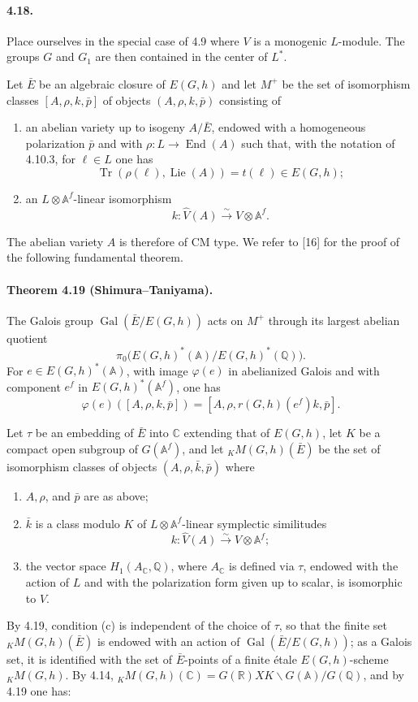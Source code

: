 \documentclass[10pt]{article}
\newcommand{\A}{\mathbb A}
\newcommand{\Af}{\mathbb A^f}
\newcommand{\C}{\mathbb C}
\newcommand{\Q}{\mathbb Q}
\newcommand{\R}{\mathbb R}
\newcommand{\Lie}{\operatorname{Lie}}
\newcommand{\Gal}{\operatorname{Gal}}
\newcommand{\End}{\operatorname{End}}
\newcommand{\Tr}{\operatorname{Tr}}
\begin{document}
\paragraph{4.18.} Place ourselves in the special case of 4.9 where $V$ is a monogenic $L$-module. The groups $G$ and $G_1$ are then contained in the center of $L^*$.

Let $\bar E$ be an algebraic closure of $E(G,h)$ and let $M^+$ be the set of isomorphism classes $[A,\rho,k,\bar p]$ of objects $(A,\rho,k,\bar p)$ consisting of
\begin{enumerate}[label=(\alph*)]
\item an abelian variety up to isogeny $A/\bar E$, endowed with a homogeneous polarization $\bar p$ and with $\rho:L\to\End(A)$ such that, with the notation of 4.10.3, for $\ell\in L$ one has
\[
\Tr(\rho(\ell),\Lie(A))=t(\ell)\in E(G,h);
\]
\item an $L\otimes\Af$-linear isomorphism
\[
k:\widehat V(A)\xrightarrow{\sim}V\otimes\Af.
\]
\end{enumerate}
The abelian variety $A$ is therefore of CM type. We refer to [16] for the proof of the following fundamental theorem.

\paragraph{Theorem 4.19 (Shimura--Taniyama).} The Galois group $\Gal(\bar E/E(G,h))$ acts on $M^+$ through its largest abelian quotient
\[
\pi_0\bigl(E(G,h)^*(\A)/E(G,h)^*(\Q)\bigr).
\]
For $e\in E(G,h)^*(\A)$, with image $\varphi(e)$ in abelianized Galois and with component $e^f$ in $E(G,h)^*(\Af)$, one has
\[
\tag{4.19.1}
\varphi(e)([A,\rho,k,\bar p])=[A,\rho,r(G,h)(e^f)k,\bar p].
\]

Let $\tau$ be an embedding of $\bar E$ into $\C$ extending that of $E(G,h)$, let $K$ be a compact open subgroup of $G(\Af)$, and let ${}_K M(G,h)(\bar E)$ be the set of isomorphism classes of objects $(A,\rho,\bar k,\bar p)$ where
\begin{enumerate}[label=(\alph*)]
\item $A,\rho$, and $\bar p$ are as above;
\item $\bar k$ is a class modulo $K$ of $L\otimes\Af$-linear symplectic similitudes
\[
k:\widehat V(A)\xrightarrow{\sim}V\otimes\Af;
\]
\item the vector space $H_1(A_\C,\Q)$, where $A_\C$ is defined via $\tau$, endowed with the action of $L$ and with the polarization form given up to scalar, is isomorphic to $V$.
\end{enumerate}
By 4.19, condition (c) is independent of the choice of $\tau$, so that the finite set ${}_K M(G,h)(\bar E)$ is endowed with an action of $\Gal(\bar E/E(G,h))$; as a Galois set, it is identified with the set of $\bar E$-points of a finite étale $E(G,h)$-scheme ${}_K M(G,h)$. By 4.14, ${}_K M(G,h)(\C)=G(\R)XK\backslash G(\A)/G(\Q)$, and by 4.19 one has:
\end{document}
